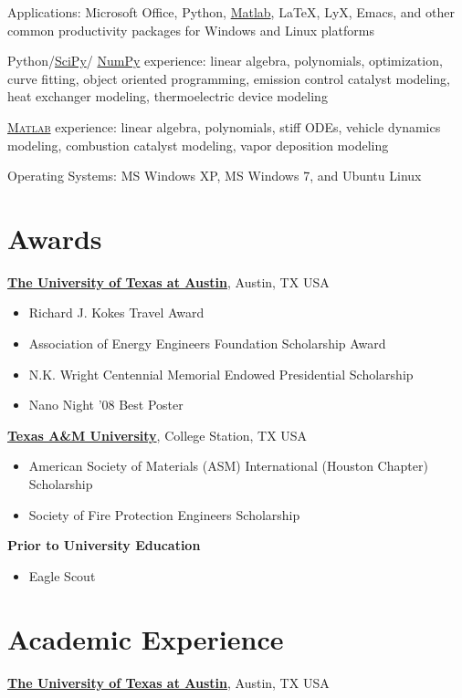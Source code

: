 \documentclass[line,margin]{res}
\begin{document}
\begin{resume}
Applications: Microsoft Office, Python,
\href{http://www.mathworks.com/products/matlab/}{Matlab}, \LaTeX, LyX,
Emacs, and other common productivity packages for Windows and Linux
platforms



Python/\href{http://www.scipy.org/}{SciPy}/%
\href{http://numpy.scipy.org/}{NumPy}
experience: linear algebra, polynomials, optimization, curve fitting,
object oriented programming, emission control catalyst modeling, heat
exchanger modeling, thermoelectric device modeling



\href{http://www.mathworks.com/products/matlab/}{\textsc{Matlab}}
experience: linear algebra, polynomials, stiff ODEs, vehicle dynamics
modeling, combustion catalyst modeling, vapor deposition modeling




Operating Systems: MS Windows XP, MS Windows 7, and Ubuntu Linux

\section{Awards}
% 
\href{http://www.utexas.edu/}{\textbf{The University of Texas at Austin}}, Austin, TX USA
\begin{itemize}
\item Richard J. Kokes Travel Award
\item Association of Energy Engineers Foundation Scholarship Award
\item N.K. Wright Centennial Memorial Endowed Presidential Scholarship
\item Nano Night '08 Best Poster
\end{itemize}



\href{http://www.tamu.edu/}{\textbf{Texas A\&M University}}, College Station, TX USA
\begin{itemize}
\item American Society of Materials (ASM) International (Houston Chapter) Scholarship
\item Society of Fire Protection Engineers Scholarship
\end{itemize}



\textbf{Prior to University Education}
\begin{itemize}
\item Eagle Scout
\end{itemize}

\section{Academic Experience}
% 
\href{http://www.utexas.edu/}{\textbf{The University of Texas at Austin}}, Austin, TX USA
\begin{itemize}


\end{itemize}
\end{resume}
\end{document}
